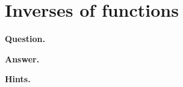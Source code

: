 \documentclass{article}
\begin{document}
\section*{Inverses of functions}
\textbf{Question.} 

\textbf{Answer.} 

\textbf{Hints.}
\begin{itemize}

\end{itemize}
\end{document}
